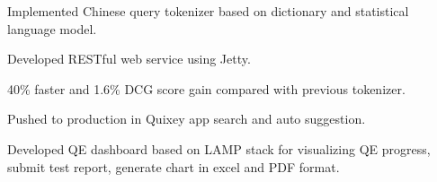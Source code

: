 \documentclass[letterpaper]{deedy-resume} %
\begin{document}
\begin{minipage}[t]{0.66\textwidth}
\sectionspace %



\sectionspace

\begin{tightitemize}
\item Implemented Chinese query tokenizer based on dictionary and statistical language model. 
\item Developed RESTful web service using Jetty.
\item 40\% faster and 1.6\% DCG score gain compared with previous tokenizer.
\item Pushed to production in Quixey app search and auto suggestion.
\end{tightitemize}

\sectionspace %



\sectionspace

\begin{tightitemize}
\item Developed QE dashboard based on LAMP stack for visualizing QE progress, submit test report, generate chart in excel and PDF format.
\end{tightitemize}

\sectionspace %


\end{minipage} %



\end{document}
